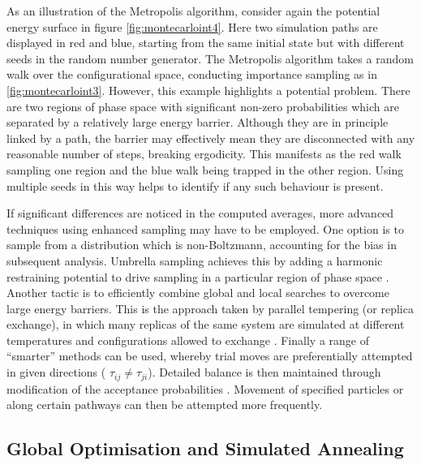 As an illustration of the Metropolis algorithm, consider again the \td{} potential energy surface in figure \ref{fig:montecarloint4}.
Here two simulation paths are displayed in red and blue, starting from the same initial state but with different %
seeds in the random number generator.
The Metropolis algorithm takes a random walk over the configurational space, conducting importance sampling as in \ref{fig:montecarloint3}.
However, this example highlights a potential problem.
There are two regions of phase space with significant non\--zero probabilities which are separated by a relatively large energy barrier.
Although they are in principle linked by a path, the barrier may effectively mean they are disconnected with any reasonable number of steps, breaking ergodicity.
This manifests as the red walk sampling one region and the blue walk being trapped in the other region.
Using multiple seeds in this way helps to identify if any such behaviour is present.

If significant differences are noticed in the computed averages, more advanced techniques using enhanced sampling may have to be employed.
One option is to sample from a distribution which is non\--Boltzmann, accounting for the bias in subsequent analysis. 
Umbrella sampling achieves this by adding a harmonic restraining potential to drive sampling in a particular region of phase space \cite{Torrie1977}.
Another tactic is to efficiently combine global and local searches to overcome large energy barriers.
This is the approach taken by parallel tempering (or replica exchange), in which many replicas of the same system are simulated at different temperatures and configurations allowed to exchange \cite{Earl2005}.
Finally a range of ``smarter'' \mc{} methods can be used, whereby trial moves are preferentially attempted in given directions (\ie{} $\tau_{ij}\neq\tau_{ji}$).
Detailed balance is then maintained through modification of the acceptance probabilities \cite{Rossky1978,Allen2017}.
Movement of specified particles or along certain pathways can then be attempted more frequently.


\subsection{Global Optimisation and Simulated Annealing}
\label{s:simulatedannealing}

